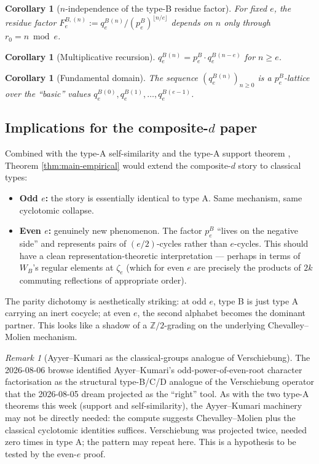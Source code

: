 \documentclass[11pt]{article}
\newtheorem{corollary}[theorem]{Corollary}
\theoremstyle{remark}
\newtheorem{remark}[theorem]{Remark}
\newcommand{\qeB}{q_e^B}
\newcommand{\peB}{p_e^B}
\newcommand{\zetae}{\zeta_e}
\begin{document}
\begin{corollary}[$n$-independence of the type-B residue factor]
For fixed $e$, the residue factor $F_e^{B, (n)} := \qeB^{(n)}/(\peB)^{\lfloor n/e\rfloor}$ depends on $n$ only through $r_0 = n \bmod e$.
\end{corollary}

\begin{corollary}[Multiplicative recursion]
$\qeB^{(n)} = \peB \cdot \qeB^{(n - e)}$ for $n \ge e$.
\end{corollary}

\begin{corollary}[Fundamental domain]
The sequence $(\qeB^{(n)})_{n \ge 0}$ is a $\peB$-lattice over the ``basic'' values $\qeB^{(0)}, \qeB^{(1)}, \ldots, \qeB^{(e-1)}$.
\end{corollary}

\subsection*{Implications for the composite-$d$ paper}

Combined with the type-A self-similarity \cite{Cli26-selfsim} and the type-A support theorem \cite{Cli26-support}, Theorem \ref{thm:main-empirical} would extend the composite-$d$ story to classical types:
\begin{itemize}
  \item \textbf{Odd $e$:} the story is essentially identical to type A. Same mechanism, same cyclotomic collapse.
  \item \textbf{Even $e$:} genuinely new phenomenon. The factor $\peB$ ``lives on the negative side'' and represents pairs of $(e/2)$-cycles rather than $e$-cycles. This should have a clean representation-theoretic interpretation --- perhaps in terms of $W_B$'s regular elements at $\zetae$ (which for even $e$ are precisely the products of $2k$ commuting reflections of appropriate order).
\end{itemize}

The parity dichotomy is aesthetically striking: at odd $e$, type B is just type A carrying an inert cocycle; at even $e$, the second alphabet becomes the dominant partner. This looks like a shadow of a $\mathbb Z/2$-grading on the underlying Chevalley--Molien mechanism.

\begin{remark}[Ayyer--Kumari as the classical-groups analogue of Verschiebung]
The 2026-08-06 browse identified Ayyer--Kumari's odd-power-of-even-root character factorisation \cite{AK26} as the structural type-B/C/D analogue of the Verschiebung operator that the 2026-08-05 dream projected as the ``right'' tool. As with the two type-A theorems this week (support and self-similarity), the Ayyer--Kumari machinery may not be directly needed: the compute suggests Chevalley--Molien plus the classical cyclotomic identities suffices. Verschiebung was projected twice, needed zero times in type A; the pattern may repeat here. This is a hypothesis to be tested by the even-$e$ proof.
\end{remark}
\end{document}
